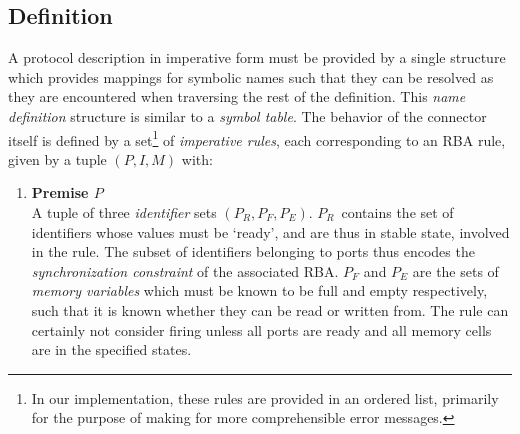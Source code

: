 \subsection{Definition}
\label{sec:imperative_form_definition}
A protocol description in imperative form must be provided by a single structure which provides mappings for symbolic names such that they can be resolved as they are encountered when traversing the rest of the definition. This \textit{name definition} structure is similar to a \textit{symbol table}. The behavior of the connector itself is defined by a set\footnote{In our implementation, these rules are provided in an ordered list, primarily for the purpose of making for more comprehensible error messages.} of \textit{imperative rules}, each corresponding to an RBA rule, given by a tuple $(P, I, M)$ with:
\begin{enumerate}
	\item \textbf{Premise $P$}\\
	A tuple of three \textit{identifier} sets $(P_R, P_F, P_E)$. $P_R$~contains the set of identifiers whose values must be `ready', and are thus in stable state, involved in the rule. The subset of identifiers belonging to ports thus encodes the \textit{synchronization constraint} of the associated RBA. $P_F$ and $P_E$ are the sets of \textit{memory variables} which must be known to be full and empty respectively, such that it is known whether they can be read or written from. The rule can certainly not consider firing unless all ports are ready and all memory cells are in the specified states.
	

\end{enumerate}
